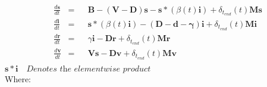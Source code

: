 \documentclass{article}
\theoremstyle{definition}
\begin{document}
\begin{align*}
&\frac{d\mathbf{s}}{dt} &=&& \mathbf{B} - (\mathbf{V} - \mathbf{D})\mathbf{s} - \mathbf{s}*(\beta(t)\mathbf
{i})+\delta_{t_{end}}(t)\mathbf{M}\mathbf{s}\\
&\frac{d\mathbf{i}}{dt} &=&&\mathbf{s}*(\beta(t)\mathbf
{i}) - (\mathbf{D}-\mathbf{d} - \mathbf{\gamma})\mathbf{i}+\delta_{t_{end}}(t)\mathbf{M}\mathbf{i}\\
&\frac{d\mathbf{r}}{dt} &=&& \gamma\mathbf{i} - \mathbf{D}\mathbf{r}+\delta_{t_{end}}(t)\mathbf{M}\mathbf{r}\\
&\frac{d\mathbf{v}}{dt} &=&& \mathbf{V}\mathbf{s}-\mathbf{D}\mathbf{v} +\delta_{t_{end}}(t)\mathbf{M}\mathbf{v}\\
\end{align*}
$\mathbf{s}*\mathbf{i}\quad\textit{Denotes the elementwise product}$\\
Where:
\end{document}
